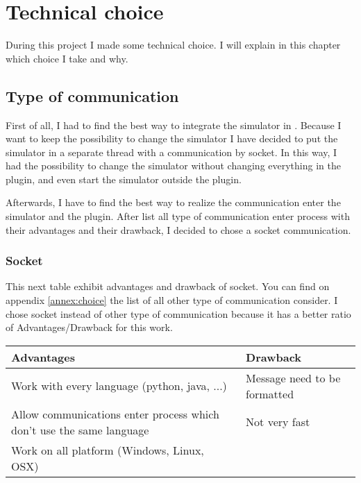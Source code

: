 
\chapter{Technical choice }
\label{chap:choice}
During this project I made some technical choice. I will explain in this chapter which choice I take and why.

\section{Type of communication}

First of all, I had to find the best way to integrate the simulator in \umld. Because I want to keep the possibility to change the simulator I have decided to put the simulator in a separate thread with a communication by socket. In this way, I had the possibility to change the simulator without changing everything in the plugin, and even start the simulator outside the plugin.

Afterwards, I have to find the best way to realize the communication enter the simulator and the plugin. After list all type of communication enter process with their advantages and their drawback, I decided to chose a socket communication.%




\subsection{Socket}

This next table exhibit advantages and drawback of socket. You can find on appendix \ref{annex:choice} the list of all other type of communication consider. I chose socket instead of other type of communication because it has a better ratio of Advantages/Drawback for this work.
~\\

\begin{tabular}{|p{}||p{}|}
  \hline
  \textbf{Advantages}&\textbf{Drawback}\\
  \hline
  Work with every language (python, java, ...) & Message need to be formatted\\
  \hline
  Allow communications enter process which don't use the same language& Not very fast\\
  \hline
  Work on all platform (Windows, Linux, OSX)&\\
  \hline
\end{tabular}


